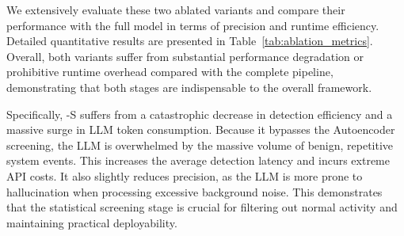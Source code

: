 \begin{table}[t!]
    \scriptsize
    \centering
    \caption{Ablation study of \toolname{}.}
    \label{tab:ablation_metrics}
\end{table}


We extensively evaluate these two ablated variants and compare their performance with the full \toolname{} model in terms of precision and runtime efficiency. Detailed quantitative results are presented in Table~\ref{tab:ablation_metrics}. Overall, both variants suffer from substantial performance degradation or prohibitive runtime overhead compared with the complete pipeline, demonstrating that both stages are indispensable to the overall framework.

Specifically, \toolname{}-S suffers from a catastrophic decrease in detection efficiency and a massive surge in LLM token consumption. Because it bypasses the Autoencoder screening, the LLM is overwhelmed by the massive volume of benign, repetitive system events. This increases the average detection latency and incurs extreme API costs. It also slightly reduces precision, as the LLM is more prone to hallucination when processing excessive background noise. This demonstrates that the statistical screening stage is crucial for filtering out normal activity and maintaining practical deployability.

